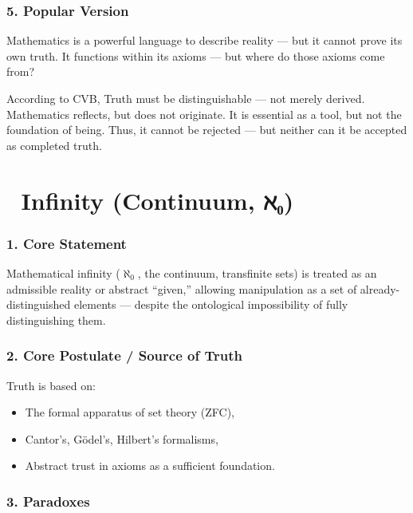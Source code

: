 \documentclass[12pt]{article}
\begin{document}
\subsubsection*{5. Popular Version}

Mathematics is a powerful language to describe reality — but it cannot prove its own truth. It functions within its axioms — but where do those axioms come from?

According to CVB, Truth must be distinguishable — not merely derived. Mathematics reflects, but does not originate. It is essential as a tool, but not the foundation of being. Thus, it cannot be rejected — but neither can it be accepted as completed truth.

\section*{🔷 Infinity (Continuum, ℵ₀)}

\subsubsection*{1. Core Statement}

Mathematical infinity ($\aleph_0$, the continuum, transfinite sets) is treated as an admissible reality or abstract ``given,'' allowing manipulation as a set of already-distinguished elements — despite the ontological impossibility of fully distinguishing them.

\subsubsection*{2. Core Postulate / Source of Truth}

Truth is based on:
\begin{itemize}
\item The formal apparatus of set theory (ZFC),
\item Cantor’s, Gödel’s, Hilbert’s formalisms,
\item Abstract trust in axioms as a sufficient foundation.
\end{itemize}

\subsubsection*{3. Paradoxes}
\end{document}
